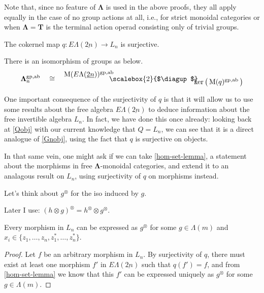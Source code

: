 \documentclass{amsbook} %
\newcommand{\mb}{\mathbf}
\newcommand{\ML}{\mathbf{\Lambda}}
\newcommand{\MLn}{\mathbf{\Lambda}_n}
\newcommand{\bigquotient}[2]{ \raisebox{0.75\height}{$#1$} \mkern-12mu\scalebox{2}{$\diagup$}\mkern-10mu \raisebox{-0.5\height}{$#2$} }
\newcommand{\EL}{E\Lambda}
\newcommand{\ELnn}{E\Lambda(\underline{2n})}
\newcommand{\ab}{\mathrm{ab}}
\newcommand{\gp}{\mathrm{gp}}
\numberwithin{section}{chapter}
\begin{document}
\begin{rem}\label{alsowithoutgroups}
Note that, since no feature of $\ML$ is used in the above proofs, they all apply equally in the case of no group actions at all, i.e., for strict monoidal categories or when $\ML = \mb{T}$ is the terminal action operad consisting only of trivial groups.
\end{rem}

\begin{cor}\label{qsurj} The cokernel map $q \colon  \EL(\underline{2n}) \rightarrow L_n$ is surjective.
\end{cor}

\begin{cor}\label{M_coker}
There is an isomorphism of groups as below.
  \[
    \MLn^{\gp,\ab} \quad \cong \quad \bigquotient{\mathrm{M}(\ELnn)^{\gp,\ab}}{\mathrm{ker}\left( \, \mathrm{M}(q)^{\gp,\ab} \, \right)}
  \]
\end{cor}

One important consequence of the surjectivity of $q$ is that it will allow us to use some results about the free algebra $\ELnn$ to deduce information about the free invertible algebra $L_n$. In fact, we have done this once already: looking back at \cref{Qobj} with our current knowledge that $Q = L_n$, we can see that it is a direct analogue of \cref{Gnobj}, using the fact that $q$ is surjective on objects. 

In that same vein, one might ask if we can take \cref{hom-set-lemma}, a statement about the morphisms in free $\ML$-monoidal categories, and extend it to an analagous result on $L_n$, using surjectivity of $q$ on morphisms instead. 

\begin{nota}\label{newaction}
Let's think about $g^{\otimes}$ for the iso induced by $g$.
\end{nota}

\begin{lem}\label{otimesotimes}
Later I use: $(h \otimes g)^{\otimes} = h^{\otimes} \otimes g^{\otimes}$.
\end{lem}

\begin{prop} \label{allmapsaction} Every morphism in $L_n$ can be expressed as $g^{\otimes}$
for some $g \in \Lambda(m)$ and $x_i \in \{z_1, \ldots, z_n, z_1^*, \ldots, z_n^* \}$.
\end{prop}

\begin{proof}
Let $f$ be an arbitrary morphism in $L_n$. By surjectivity of $q$, there must exist at least one morphism $f'$ in $\ELnn$ such that $q(f') = f$, and from \cref{hom-set-lemma} we know that this $f'$ can be expressed uniquely as $g^{\otimes}$ for some $g \in \Lambda(m)$. 
\end{proof}
\end{document}
